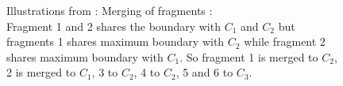 \begin{figure}[h]
  \centering
  \captionsetup[subfloat]{labelformat=empty}
%
%
%
%
\caption{Illustrations from \cite{umesh2001efficient}: Merging of fragments :\\
Fragment 1 and 2 shares the boundary with \( C_1 \) and \( C_2 \) but fragments 1 shares maximum boundary with \( C_2 \) while fragment 2 shares maximum boundary with  {\( C_1 \)}. So fragment 1 is merged to  {\( C_2 \)}, 2 is merged to {\( C_1 \)}, 3 to {\( C_2 \)}, 4 to {\( C_2 \)}, 5 and 6 to {\( C_3 \)}.}
  \label{fig:watershedIllustration}
\end{figure}
